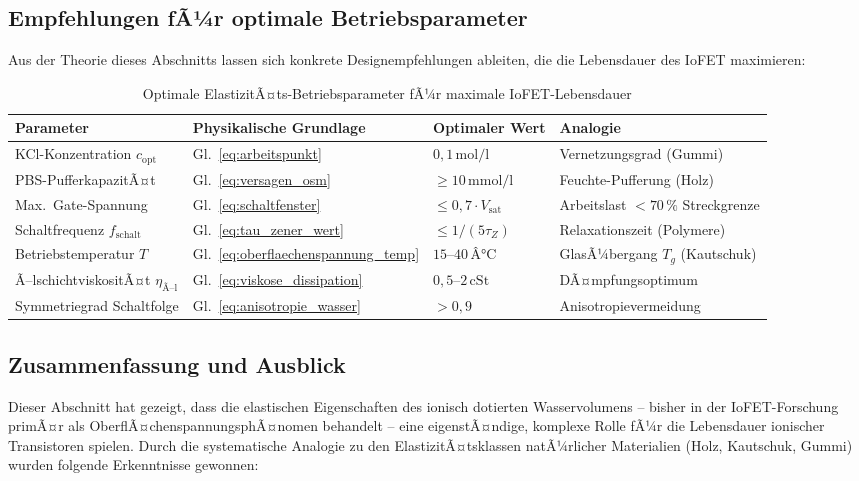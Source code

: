 ﻿\documentclass[a4paper,12pt]{scrreprt}
\theoremstyle{definition}
\begin{document}
\subsection{Empfehlungen fÃ¼r optimale Betriebsparameter}

Aus der Theorie dieses Abschnitts lassen sich konkrete Designempfehlungen
ableiten, die die Lebensdauer des IoFET maximieren:

\begin{table}[H]
	\centering
	\caption{Optimale ElastizitÃ¤ts-Betriebsparameter fÃ¼r maximale IoFET-Lebensdauer}
	\label{tab:optimale_parameter}
	\begin{tabular}{p{4.5cm}p{3.5cm}p{2.8cm}p{3cm}}
		\toprule
		\textbf{Parameter} & \textbf{Physikalische Grundlage} & \textbf{Optimaler Wert} & \textbf{Analogie} \\
		\midrule
		KCl-Konzentration $c_{\mathrm{opt}}$ & Gl.~\eqref{eq:arbeitspunkt} & $0{,}1\,\mathrm{mol/l}$ & Vernetzungsgrad (Gummi) \\
		PBS-PufferkapazitÃ¤t & Gl.~\eqref{eq:versagen_osm} & $\geq 10\,\mathrm{mmol/l}$ & Feuchte-Pufferung (Holz) \\
		Max.\ Gate-Spannung & Gl.~\eqref{eq:schaltfenster} & $\leq 0{,}7 \cdot V_{\mathrm{sat}}$ & Arbeitslast $< 70\,\%$ Streckgrenze \\
		Schaltfrequenz $f_{\mathrm{schalt}}$ & Gl.~\eqref{eq:tau_zener_wert} & $\leq 1/(5\tau_Z)$ & Relaxationszeit (Polymere) \\
		Betriebstemperatur $T$ & Gl.~\eqref{eq:oberflaechenspannung_temp} & $15$--$40\,Â°\mathrm{C}$ & GlasÃ¼bergang $T_g$ (Kautschuk) \\
		Ã–lschichtviskositÃ¤t $\eta_{\mathrm{Ã–l}}$ & Gl.~\eqref{eq:viskose_dissipation} & $0{,}5$--$2\,\mathrm{cSt}$ & DÃ¤mpfungs\-optimum \\
		Symmetriegrad Schaltfolge & Gl.~\eqref{eq:anisotropie_wasser} & $> 0{,}9$ & Anisotropievermei\-dung \\
		\bottomrule
	\end{tabular}
\end{table}

\subsection{Zusammenfassung und Ausblick}

Dieser Abschnitt hat gezeigt, dass die elastischen Eigenschaften des
ionisch dotierten Wasservolumens -- bisher in der IoFET-Forschung primÃ¤r
als OberflÃ¤chenspannungsphÃ¤nomen behandelt -- eine eigenstÃ¤ndige,
komplexe Rolle fÃ¼r die Lebensdauer ionischer Transistoren spielen.
Durch die systematische Analogie zu den ElastizitÃ¤tsklassen natÃ¼rlicher
Materialien (Holz, Kautschuk, Gummi) wurden folgende Erkenntnisse gewonnen:
\end{document}
